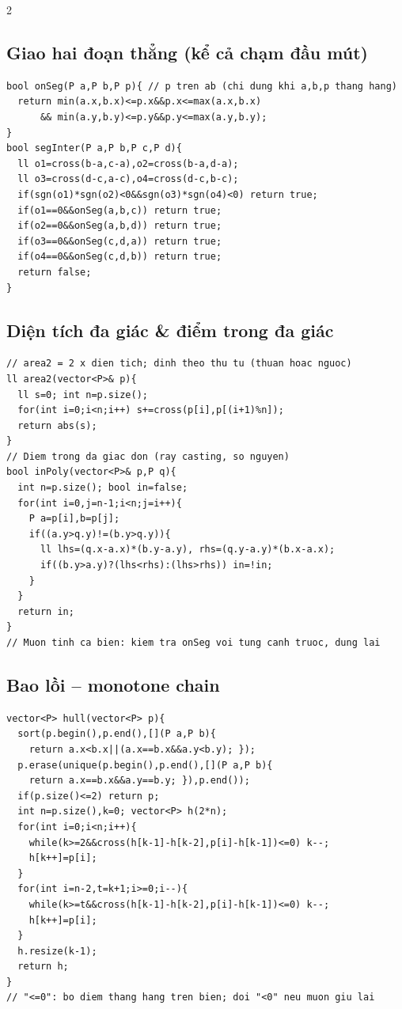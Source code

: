 \documentclass[8pt]{extarticle}
\begin{document}
\begin{multicols}{2}
\subsection{Giao hai đoạn thẳng (kể cả chạm đầu mút)}
\begin{lstlisting}
bool onSeg(P a,P b,P p){ // p tren ab (chi dung khi a,b,p thang hang)
  return min(a.x,b.x)<=p.x&&p.x<=max(a.x,b.x)
      && min(a.y,b.y)<=p.y&&p.y<=max(a.y,b.y);
}
bool segInter(P a,P b,P c,P d){
  ll o1=cross(b-a,c-a),o2=cross(b-a,d-a);
  ll o3=cross(d-c,a-c),o4=cross(d-c,b-c);
  if(sgn(o1)*sgn(o2)<0&&sgn(o3)*sgn(o4)<0) return true;
  if(o1==0&&onSeg(a,b,c)) return true;
  if(o2==0&&onSeg(a,b,d)) return true;
  if(o3==0&&onSeg(c,d,a)) return true;
  if(o4==0&&onSeg(c,d,b)) return true;
  return false;
}
\end{lstlisting}

\subsection{Diện tích đa giác \& điểm trong đa giác}
\begin{lstlisting}
// area2 = 2 x dien tich; dinh theo thu tu (thuan hoac nguoc)
ll area2(vector<P>& p){
  ll s=0; int n=p.size();
  for(int i=0;i<n;i++) s+=cross(p[i],p[(i+1)%n]);
  return abs(s);
}
// Diem trong da giac don (ray casting, so nguyen)
bool inPoly(vector<P>& p,P q){
  int n=p.size(); bool in=false;
  for(int i=0,j=n-1;i<n;j=i++){
    P a=p[i],b=p[j];
    if((a.y>q.y)!=(b.y>q.y)){
      ll lhs=(q.x-a.x)*(b.y-a.y), rhs=(q.y-a.y)*(b.x-a.x);
      if((b.y>a.y)?(lhs<rhs):(lhs>rhs)) in=!in;
    }
  }
  return in;
}
// Muon tinh ca bien: kiem tra onSeg voi tung canh truoc, dung lai
\end{lstlisting}

\subsection{Bao lồi -- monotone chain}
\begin{lstlisting}
vector<P> hull(vector<P> p){
  sort(p.begin(),p.end(),[](P a,P b){
    return a.x<b.x||(a.x==b.x&&a.y<b.y); });
  p.erase(unique(p.begin(),p.end(),[](P a,P b){
    return a.x==b.x&&a.y==b.y; }),p.end());
  if(p.size()<=2) return p;
  int n=p.size(),k=0; vector<P> h(2*n);
  for(int i=0;i<n;i++){
    while(k>=2&&cross(h[k-1]-h[k-2],p[i]-h[k-1])<=0) k--;
    h[k++]=p[i];
  }
  for(int i=n-2,t=k+1;i>=0;i--){
    while(k>=t&&cross(h[k-1]-h[k-2],p[i]-h[k-1])<=0) k--;
    h[k++]=p[i];
  }
  h.resize(k-1);
  return h;
}
// "<=0": bo diem thang hang tren bien; doi "<0" neu muon giu lai
\end{lstlisting}


\end{multicols}
\end{document}
